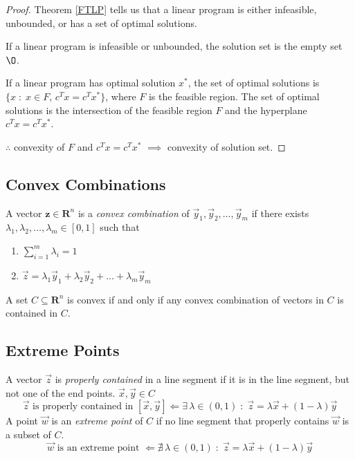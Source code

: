 \begin{proof}
Theorem \ref{FTLP} tells us that a linear program is either infeasible, unbounded, or has a set of optimal solutions.

If a linear program is infeasible or unbounded, the solution set is the empty set $\O$.

If a linear program has optimal solution $x^*$, the set of optimal solutions is $\{x\; : \;x \in F,\, c^Tx=c^Tx^*\}$, where $F$ is the feasible region. The set of optimal solutions is the intersection of the feasible region $F$ and the hyperplane $c^Tx=c^Tx^*$.

$\therefore$ convexity of $F$ and $c^Tx=c^Tx^*$ $\implies$ convexity of solution set.
\end{proof}


\subsection{Convex Combinations}
A vector $\mathbf{z} \in \mathbf{R}^n$ is a \emph{convex combination} of $\Vec{y}_1, \Vec{y}_2, \dots , \Vec{y}_m$ if there exists $\lambda_1, \lambda_2, \dots , \lambda_m \in [0,1]$ such that

\begin{enumerate}
    \item $\sum_{i=1}^m \lambda_i = 1$
    \item $\Vec{z} = \lambda_1 \Vec{y}_1 + \lambda_2 \Vec{y}_2 + \dots + \lambda_m \Vec{y}_m$
\end{enumerate}

\begin{theorem}
A set $C\subseteq \mathbf{R}^n$ is convex if and only if any convex combination of vectors in $C$ is contained in $C$.
\end{theorem}


\subsection{Extreme Points}
A vector $\Vec{z}$ is \emph{properly contained} in a line segment if it is in the line segment, but not one of the end points. $\Vec{x},\Vec{y} \in C$
\begin{equation*}
    \Vec{z} \text{ is properly contained in } [\Vec{x}, \vec{y}] \Longleftarrow \exists \, \lambda \in (0,1) \; : \; \Vec{z} = \lambda \Vec{x} + (1-\lambda)\Vec{y}
\end{equation*}
A point $\Vec{w}$ is an \emph{extreme point} of $C$ if no line segment that properly contains $\Vec{w}$ is a subset of $C$. 
\begin{equation*}
    \Vec{w} \text{ is an extreme point } \Longleftarrow \nexists \, \lambda \in (0,1) \; : \;  \Vec{z} = \lambda \Vec{x} + (1-\lambda)\Vec{y}
\end{equation*}

